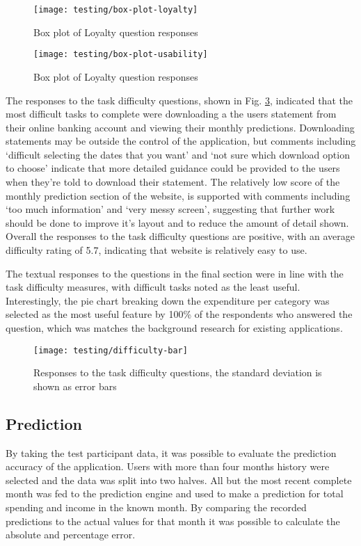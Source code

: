 \begin{figure}
\centering
\texttt{[image: testing/box-plot-loyalty]}
\caption{Box plot of Loyalty question responses\protect\footnotemark}
\label{fig:box-loyalty}
\end{figure}


\begin{figure}
\centering
\texttt{[image: testing/box-plot-usability]}
\caption{Box plot of Loyalty question responses}
\label{fig:box-usablity}
\end{figure}

The responses to the task difficulty questions, shown in Fig. \ref{fig:box-difficulty}, indicated that the most difficult tasks to complete were downloading a the users statement from their online banking account and viewing their monthly predictions.
%
Downloading statements may be outside the control of the application, but comments including `difficult selecting the dates that you want' and `not sure which download option to choose' indicate that more detailed guidance could be provided to the users when they're told to download their statement.
%
The relatively low score of the monthly prediction section of the website, is supported with comments including `too much information' and `very messy screen', suggesting that further work should be done to improve it's layout and to reduce the amount of detail shown.
%
Overall the responses to the task difficulty questions are positive, with an average difficulty rating of 5.7, indicating that website is relatively easy to use.

The textual responses to the questions in the final section were in line with the task difficulty measures, with difficult tasks noted as the least useful. Interestingly, the pie chart breaking down the expenditure per category was selected as the most useful feature by 100\% of the respondents who answered the question, which was matches the background research for existing applications.

\begin{figure}
\centering
\texttt{[image: testing/difficulty-bar]}
\caption[Responses to the task difficulty questions]{Responses to the task difficulty questions, the standard deviation is shown as error bars}
\label{fig:box-difficulty}
\end{figure}

\subsection{Prediction}
By taking the test participant data, it was possible to evaluate the prediction accuracy of the application. Users with more than four months history were selected and the data was split into two halves. All but the most recent complete month was fed to the prediction engine and used to make a prediction for total spending and income in the known month. By comparing the recorded predictions to the actual values for that month it was possible to calculate the absolute and percentage error.

